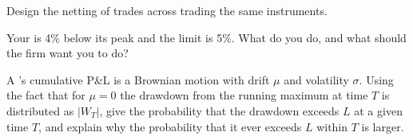 \begin{interviewq}\label{iq:s1:running-a-multi-strategy-book:4}
Design the netting of trades across  trading the same instruments.
\end{interviewq}

\begin{interviewq}\label{iq:s1:running-a-multi-strategy-book:5}
Your  is 4\% below its peak and the limit is 5\%. What do you do, and what should the firm want you to do?
\end{interviewq}

\begin{interviewq}\label{iq:s1:running-a-multi-strategy-book:6}
A 's cumulative P\&L is a Brownian motion with drift $\mu$ and volatility $\sigma$. Using the fact that for $\mu = 0$ the drawdown from the running
maximum at time $T$ is distributed as $|W_T|$, give the probability that the drawdown exceeds $L$ at a given time $T$, and explain why the probability that
it ever exceeds $L$ within $T$ is larger.
\end{interviewq}
